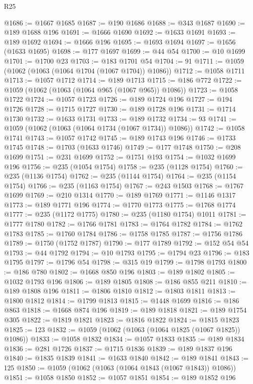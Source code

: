 \begin{lexlean}{R25}
\begin{coremodule}
@1686 := @1667 @1685
@1687 := @190 @1686
@1688 := @343 @1687
@1690 := @189 @1688 @196
@1691 := @1666 @1690
@1692 := @1633 @1691
@1693 := @189 @1692
@1694 := @1666 @196
@1695 := @1693 @1694
@1697 := @1656 (@1633 @1695)
@1698 := @177 @1697
@1699 := @44 @54
@1700 := @10 @1699
@1701 := @1700 @23
@1703 := @183 @1701 @54
@1704 := 91
@1711 := @1059 (@1062 (@1063 (@1064 @1704 (@1067 @1704)) @1086))
@1712 := @1058 @1711
@1713 := @1057 @1712
@1714 := @189 @1713
@1715 := @186 @772
@1722 := @1059 (@1062 (@1063 (@1064 @965 (@1067 @965)) @1086))
@1723 := @1058 @1722
@1724 := @1057 @1723
@1726 := @189 @1724 @196
@1727 := @194 @1726
@1728 := @1715 @1727
@1730 := @189 @1728 @196
@1731 := @1714 @1730
@1732 := @1633 @1731
@1733 := @189 @1732
@1734 := 93
@1741 := @1059 (@1062 (@1063 (@1064 @1734 (@1067 @1734)) @1086))
@1742 := @1058 @1741
@1743 := @1057 @1742
@1745 := @189 @1743 @196
@1746 := @1733 @1745
@1748 := @1703 (@1633 @1746)
@1749 := @177 @1748
@1750 := @208 @1699
@1751 := @231 @1699
@1752 := @1751 @193
@1754 := @1032 @1699 @196
@1756 := @235 (@1054 @1754)
@1758 := @235 (@1128 @1754)
@1760 := @235 (@1136 @1754)
@1762 := @235 (@1144 @1754)
@1764 := @235 (@1154 @1754)
@1766 := @235 (@1163 @1754)
@1767 := @243 @1503
@1768 := @1767 @1699
@1769 := @210 @1314
@1770 := @189 @1769
@1771 := @1146 @1317
@1773 := @189 @1771 @196
@1774 := @1770 @1773
@1775 := @1768 @1774
@1777 := @235 (@1172 @1775)
@1780 := @235 (@1180 @1754) @1011
@1781 := @1777 @1780
@1782 := @1766 @1781
@1783 := @1764 @1782
@1784 := @1762 @1783
@1785 := @1760 @1784
@1786 := @1758 @1785
@1787 := @1756 @1786
@1789 := @1750 (@1752 @1787)
@1790 := @177 @1789
@1792 := @152 @54 @54
@1793 := @44 @1792
@1794 := @10 @1793
@1795 := @1794 @23
@1796 := @183 @1795
@1797 := @1796 @54
@1798 := @315 @19
@1799 := @1798 @1793
@1800 := @186 @780
@1802 := @1668 @850 @196
@1803 := @189 @1802
@1805 := @1032 @1793 @196
@1806 := @189 @1805
@1808 := @186 @855 @211
@1810 := @189 @1808 @196
@1811 := @1806 @1810
@1812 := @1803 @1811
@1813 := @1800 @1812
@1814 := @1799 @1813
@1815 := @1448 @1699
@1816 := @186 @863
@1818 := @1668 @874 @196
@1819 := @189 @1818
@1821 := @189 @1754 @305
@1822 := @1819 @1821
@1823 := @1816 @1822
@1824 := @1815 @1823
@1825 := 123
@1832 := @1059 (@1062 (@1063 (@1064 @1825 (@1067 @1825)) @1086))
@1833 := @1058 @1832
@1834 := @1057 @1833
@1835 := @189 @1834
@1836 := @281 @1726
@1837 := @1715 @1836
@1839 := @189 @1837 @196
@1840 := @1835 @1839
@1841 := @1633 @1840
@1842 := @189 @1841
@1843 := 125
@1850 := @1059 (@1062 (@1063 (@1064 @1843 (@1067 @1843)) @1086))
@1851 := @1058 @1850
@1852 := @1057 @1851
@1854 := @189 @1852 @196

\end{coremodule}
\end{lexlean}

